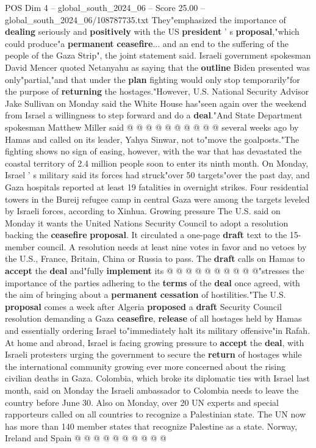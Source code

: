 \begin{textsample}{POS Dim 4 – global\_south\_2024\_06 – Score 25.00 – global\_south\_2024\_06/108787735.txt}
They"emphasized the importance of \textbf{dealing} seriously and \textbf{positively} with the US \textbf{president} ' s \textbf{proposal},"which could produce"a \textbf{permanent} \textbf{ceasefire}... and an end to the suffering of the people of the Gaza Strip", the joint statement said.
Israeli government spokesman David Mencer quoted Netanyahu as saying that the \textbf{outline} Biden presented was only"partial,"and that under the \textbf{plan} fighting would only stop temporarily"for the purpose of \textbf{returning} the hostages."However, U.S.
National Security Advisor Jake Sullivan on Monday said the White House has"seen again over the weekend from Israel a willingness to step forward and do a \textbf{deal}."And State Department spokesman Matthew Miller said @ @ @ @ @ @ @ @ @ @ several weeks ago by Hamas and called on its leader, Yahya Sinwar, not to"move the goalposts."The fighting shows no sign of easing, however, with the war that has devastated the coastal territory of 2.4 million people soon to enter its ninth month.
On Monday, Israel ' s military said its forces had struck"over 50 targets"over the past day, and Gaza hospitals reported at least 19 fatalities in overnight strikes.
Four residential towers in the Bureij refugee camp in central Gaza were among the targets leveled by Israeli forces, according to Xinhua.
Growing pressure The U.S. said on Monday it wants the United Nations Security Council to adopt a resolution backing the \textbf{ceasefire} \textbf{proposal}.
It circulated a one-page \textbf{draft} text to the 15-member council.
A resolution needs at least nine votes in favor and no vetoes by the U.S., France, Britain, China or Russia to pass.
The \textbf{draft} calls on Hamas to \textbf{accept} the \textbf{deal} and"fully \textbf{implement} its @ @ @ @ @ @ @ @ @ @"stresses the importance of the parties adhering to the \textbf{terms} of the \textbf{deal} once agreed, with the aim of bringing about a \textbf{permanent} \textbf{cessation} of hostilities."The U.S. \textbf{proposal} comes a week after Algeria \textbf{proposed} a \textbf{draft} Security Council resolution demanding a Gaza \textbf{ceasefire}, \textbf{release} of all hostages held by Hamas and essentially ordering Israel to"immediately halt its military offensive"in Rafah.
At home and abroad, Israel is facing growing pressure to \textbf{accept} the \textbf{deal}, with Israeli protesters urging the government to secure the \textbf{return} of hostages while the international community growing ever more concerned about the rising civilian deaths in Gaza.
Colombia, which broke its diplomatic ties with Israel last month, said on Monday the Israeli ambassador to Colombia needs to leave the country before June 30.
Also on Monday, over 20 UN experts and special rapporteurs called on all countries to recognize a Palestinian state.
The UN now has more than 140 member states that recognize Palestine as a state.
Norway, Ireland and Spain @ @ @ @ @ @ @ @ @ @

\end{textsample}
